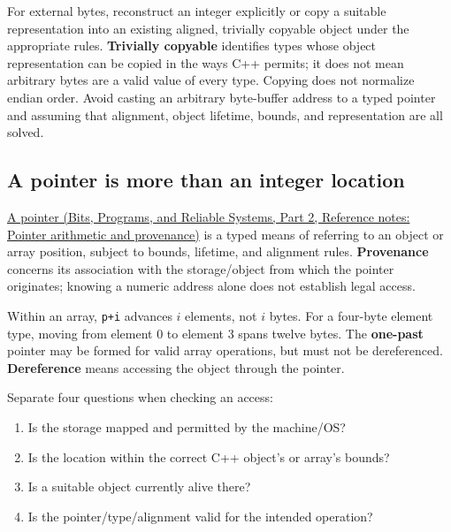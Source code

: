 For external bytes, reconstruct an integer explicitly or copy a suitable representation into an existing aligned, trivially copyable object under the appropriate rules. \textbf{Trivially copyable} identifies types whose object representation can be copied in the ways C++ permits; it does not mean arbitrary bytes are a valid value of every type. Copying does not normalize endian order. Avoid casting an arbitrary byte-buffer address to a typed pointer and assuming that alignment, object lifetime, bounds, and representation are all solved.

\subsection{A pointer is more than an integer location}\label{05-engine-i-ch002-a-pointer-is-more-than-an-integer-location}

\hypertarget{05-engine-i-ch002-a-pointer-is-more-than-an-integer-location}{}

\href{../01-Bits-Programs-and-Reliable-Systems-P02/main.pdf\#nameddest=appendix-6af5921bc853}{A pointer (Bits, Programs, and Reliable Systems, Part 2, Reference notes: Pointer arithmetic and provenance)} is a typed means of referring to an object or array position, subject to bounds, lifetime, and alignment rules. \textbf{Provenance} concerns its association with the storage/object from which the pointer originates; knowing a numeric address alone does not establish legal access.

Within an array, \texttt{p+i} advances \(i\) elements, not \(i\) bytes. For a four-byte element type, moving from element 0 to element 3 spans twelve bytes. The \textbf{one-past} pointer may be formed for valid array operations, but must not be dereferenced. \textbf{Dereference} means accessing the object through the pointer.

Separate four questions when checking an access:

\begin{enumerate}
\def\labelenumi{\arabic{enumi}.}
\tightlist
\item
  Is the storage mapped and permitted by the machine/OS?
\item
  Is the location within the correct C++ object's or array's bounds?
\item
  Is a suitable object currently alive there?
\item
  Is the pointer/type/alignment valid for the intended operation?
\end{enumerate}

